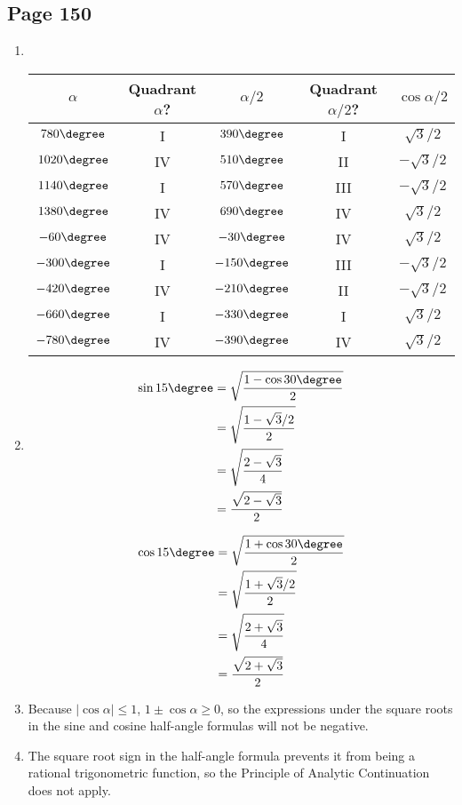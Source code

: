 \documentclass{article}
\newenvironment{solutions}[1]
{\subsection*{#1}
 \begin{enumerate}[leftmargin=1.5em]}
{\end{enumerate}}
\newcommand{\solution}{\item}
\begin{document}
\begin{solutions}{Page 150}
\solution ~ %
\begin{center}
\bgroup
\def\arraystretch{2.1}
\setlength\tabcolsep{15pt}
\begin{tabular}{ |c|c|c|c|c| }
\hline
$\alpha$
& Quadrant $\alpha$?
& $\alpha / 2$
& Quadrant $\alpha / 2$?
& $\cos{\alpha / 2}$\\
\hline
$780\degree$
& I
& $390\degree$
& I
& $\sqrt{3} / 2$\\
\hline
$1020\degree$
& IV
& $510\degree$
& II
& $-\sqrt{3} / 2$\\
\hline
$1140\degree$
& I
& $570\degree$
& III
& $-\sqrt{3} / 2$\\
\hline
$1380\degree$
& IV
& $690\degree$
& IV
& $\sqrt{3} / 2$\\
\hline
$-60\degree$
& IV
& $-30\degree$
& IV
& $\sqrt{3} / 2$\\
\hline
$-300\degree$
& I
& $-150\degree$
& III
& $-\sqrt{3} / 2$\\
\hline
$-420\degree$
& IV
& $-210\degree$
& II
& $-\sqrt{3} / 2$\\
\hline
$-660\degree$
& I
& $-330\degree$
& I
& $\sqrt{3} / 2$\\
\hline
$-780\degree$
& IV
& $-390\degree$
& IV
& $\sqrt{3} / 2$\\
\hline
\end{tabular}
\egroup
\end{center}

\solution %
\begin{align*}
\sin{15\degree} &= \sqrt{\dfrac{1-\cos{30\degree}}{2}} \\
&= \sqrt{\dfrac{1-\sqrt{3}/2}{2}} \\
&= \sqrt{\dfrac{2-\sqrt{3}}{4}} \\
&= \dfrac{\sqrt{2-\sqrt{3}}}{2}
\end{align*}

\begin{align*}
\cos{15\degree} &= \sqrt{\dfrac{1+\cos{30\degree}}{2}} \\
&= \sqrt{\dfrac{1+\sqrt{3}/2}{2}} \\
&= \sqrt{\dfrac{2+\sqrt{3}}{4}} \\
&= \dfrac{\sqrt{2+\sqrt{3}}}{2}
\end{align*}

\solution %
Because $\left\lvert \cos{\alpha} \right\rvert \leq 1$, $1 \pm \cos{\alpha} \geq 0$, so the expressions under the square roots in the sine and cosine half-angle formulas will not be negative.

\solution %
The square root sign in the half-angle formula prevents it from being a rational trigonometric function, so the Principle of Analytic Continuation does not apply.


\end{solutions}
\end{document}
